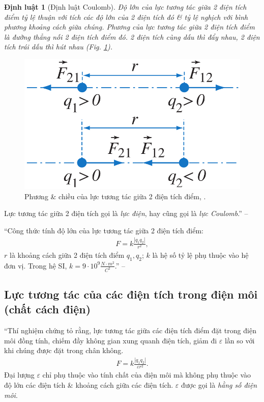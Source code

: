 \documentclass[oneside]{book}
\numberwithin{equation}{section}
\newtheorem{dinhluat}{Định luật}[section]
\begin{document}
\begin{dinhluat}[Định luật Coulomb]
	Độ lớn của lực tương tác giữa 2 điện tích điểm tỷ lệ thuận với tích các độ lớn của 2 điện tích đó \& tỷ lệ nghịch với bình phương khoảng cách giữa chúng. Phương của lực tương tác giữa 2 điện tích điểm là đường thẳng nối 2 điện tích điểm đó. 2 điện tích cùng dấu thì đẩy nhau, 2 điện tích trái dấu thì hút nhau (Fig. \ref{fig:luc tuong tac giua 2 dien tich diem}).
\end{dinhluat}

\begin{figure}[H]
	\centering
	\includegraphics[scale=0.15]{luc_tuong_tac_giua_2_dien_tich_diem}
	\caption{Phương \& chiều của lực tương tác giữa 2 điện tích điểm, \cite[Hình 1.6, p. 7]{SGK_Vat_Ly_11_nang_cao}.}
	\label{fig:luc tuong tac giua 2 dien tich diem}
\end{figure}
Lực tương tác giữa 2 điện tích gọi là \textit{lực điện}, hay cũng gọi là \textit{lực Coulomb}.'' -- \cite[p. 7]{SGK_Vat_Ly_11_nang_cao}

``Công thức tính độ lớn của lực tương tác giữa 2 điện tích điểm:
\begin{align}
	\label{luc tuong tac giua 2 dien tich diem}
	F = k\frac{|q_1q_2|}{r^2},
\end{align}
$r$ là khoảng cách giữa 2 điện tích điểm $q_1,q_2$; $k$ là hệ số tỷ lệ phụ thuộc vào hệ đơn vị. Trong hệ SI, $k = 9\cdot 10^9\frac{N\cdot m^2}{C^2}$.'' -- \cite[p. 8]{SGK_Vat_Ly_11_nang_cao}

\subsection{Lực tương tác của các điện tích trong điện môi (chất cách điện)}
``Thí nghiệm chứng tỏ rằng, lực tương tác giữa các điện tích điểm đặt trong điện môi đồng tính, chiếm đầy không gian xung quanh điện tích, giảm đi $\varepsilon$ lần so với khi chúng được đặt trong chân không.
\begin{align}
	\label{luc tuong tac cua cac dien tich trong dien moi}
	F = k\frac{|q_1q_2|}{\varepsilon r^2}.
\end{align}
Đại lượng $\varepsilon$ chỉ phụ thuộc vào tính chất của điện môi mà không phụ thuộc vào độ lớn các điện tích \& khoảng cách giữa các điện tích. $\varepsilon$ được gọi là \textit{hằng số điện môi}.
\end{document}
